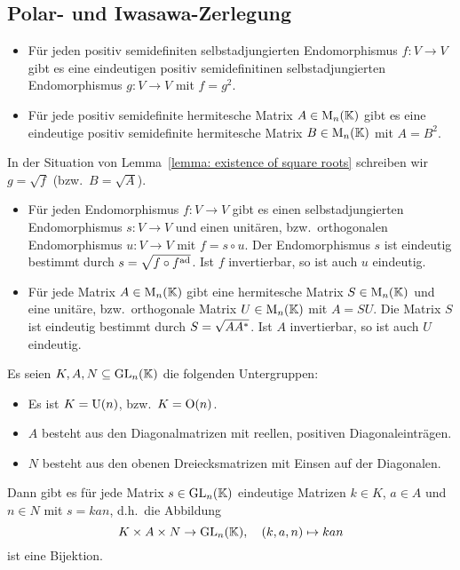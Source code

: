 \subsection{Polar- und Iwasawa-Zerlegung}

\begin{lemma}
  \label{lemma: existence of square roots}
  \begin{itemize}
    \item
      Für jeden positiv semidefiniten selbstadjungierten Endomorphismus $f \colon V \to V$ gibt es eine eindeutigen positiv semidefinitinen selbstadjungierten Endomorphismus $g \colon V \to V$ mit $f = g^2$.
    \item
      Für jede positiv semidefinite hermitesche Matrix $A \in \operatorname{M}_{n}(\mathbb{K})$ gibt es eine eindeutige positiv semidefinite hermitesche Matrix $B \in \operatorname{M}_{n}(\mathbb{K})$ mit $A = B^2$.
  \end{itemize}
\end{lemma}

In der Situation von Lemma~\ref{lemma: existence of square roots} schreiben wir $g = \sqrt{f}$ (bzw.\ $B = \sqrt{A}$).

\begin{theorem}[Polarzerlegung]
  \begin{itemize}
    \item
      Für jeden Endomorphismus $f \colon V \to V$ gibt es einen selbstadjungierten Endomorphismus $s \colon V \to V$ und einen unitären, bzw.\ orthogonalen Endomorphismus $u \colon V \to V$ mit $f = s \circ u$.
      Der Endomorphismus $s$ ist eindeutig bestimmt durch $s = \sqrt{f \circ f^{\operatorname{ad}}}$.
      Ist $f$ invertierbar, so ist auch $u$ eindeutig.
    
    \item
      Für jede Matrix $A \in \operatorname{M}_{n}(\mathbb{K})$ gibt eine hermitesche Matrix $S \in \operatorname{M}_{n}(\mathbb{K})$ und eine unitäre, bzw.\ orthogonale Matrix $U \in \operatorname{M}_{n}(\mathbb{K})$ mit $A = SU$.
      Die Matrix $S$ ist eindeutig bestimmt durch $S = \sqrt{A A^*}$.
      Ist $A$ invertierbar, so ist auch $U$ eindeutig.
  \end{itemize}
\end{theorem}

\begin{theorem}
  Es seien $K, A, N \subseteq \operatorname{GL}_{n}(\mathbb{K})$ die folgenden Untergruppen:
  \begin{itemize}
    \item
      Es ist $K = \operatorname{U}(n)$, bzw.\ $K = \operatorname{O}(n)$.
    \item
      $A$ besteht aus den Diagonalmatrizen mit reellen, positiven Diagonaleinträgen.
    \item
      $N$ besteht aus den obenen Dreiecksmatrizen mit Einsen auf der Diagonalen.
  \end{itemize}
  Dann gibt es für jede Matrix $s \in \operatorname{GL}_{n}(\mathbb{K})$ eindeutige Matrizen $k \in K$, $a \in A$ und $n \in N$ mit $s = kan$, d.h.\ die Abbildung
  \[
            K \times A \times N
    \to     \operatorname{GL}_{n}(\mathbb{K}),
    \quad   (k, a, n)
    \mapsto kan
  \]
  ist eine Bijektion.
\end{theorem}

